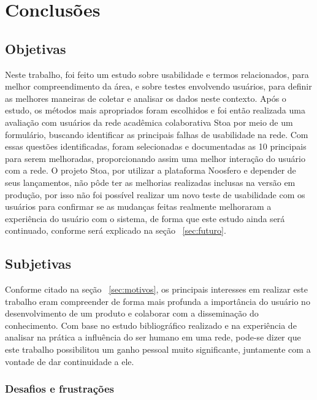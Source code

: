 \chapter{Conclusões}
\label{cap:conclusoes}

\section{Objetivas}
\label{sec:objetivas}

    Neste trabalho, foi feito um estudo sobre usabilidade e termos relacionados, para melhor compreendimento da área, e sobre testes envolvendo usuários, para definir as melhores maneiras de coletar e analisar os dados neste contexto.
    Após o estudo, os métodos mais apropriados foram escolhidos e foi então realizada uma avaliação com usuários da rede acadêmica colaborativa Stoa por meio de um formulário, buscando identificar as principais falhas de usabilidade na rede. Com essas questões identificadas, foram selecionadas e documentadas as 10 principais para serem melhoradas, proporcionando assim uma melhor interação do usuário com a rede.
    O projeto Stoa, por utilizar a plataforma Noosfero e depender de seus lançamentos, não pôde ter as melhorias realizadas inclusas na versão em produção, por isso não foi possível realizar um novo teste de usabilidade com os usuários para confirmar se as mudanças feitas realmente melhoraram a experiência do usuário com o sistema, de forma que este estudo ainda será continuado, conforme será explicado na seção ~\ref{sec:futuro}.
    
\section{Subjetivas}
\label{sec:subjetivas}

    Conforme citado na seção ~\ref{sec:motivos}, os principais interesses em realizar este trabalho eram compreender de forma mais profunda a importância do usuário no desenvolvimento de um produto e colaborar com a disseminação do conhecimento. Com base no estudo bibliográfico realizado e na experiência de analisar na prática a influência do ser humano em uma rede, pode-se dizer que este trabalho possibilitou um ganho pessoal muito significante, juntamente com a vontade de dar continuidade a ele.
   
\subsection{Desafios e frustrações}

